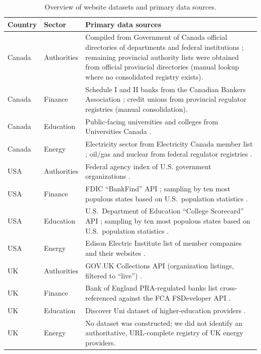 \documentclass[conference]{IEEEtran}
\begin{document}
\begin{table}[t]
  \caption{Overview of website datasets and primary data sources.}
  \label{tab:dataset_sources}
  \centering
  \scriptsize
  \setlength{\tabcolsep}{3pt}
  \renewcommand{\arraystretch}{1.15}
  \begin{tabularx}{\columnwidth}{l l X}
  \toprule
  Country & Sector & Primary data sources \\
  \midrule
  Canada & Authorities &
  Compiled from Government of Canada official directories of departments and federal institutions
  \cite{canada_depts,canada_institutions}; remaining provincial authority lists were obtained from
  official provincial directories (manual lookup where no consolidated registry exists). \\
  Canada & Finance &
  Schedule I and II banks from the Canadian Bankers Association \cite{cba_member_banks_2024};
  credit unions from provincial regulator registries (manual consolidation). \\
  Canada & Education &
  Public-facing universities and colleges from Universities Canada \cite{ca_unis_list}. \\
  Canada & Energy &
  Electricity sector from Electricity Canada member list \cite{electric_canada_members};
  oil/gas and nuclear from federal regulator registries \cite{cer_pipeline_companies,cnsc_nuclear_facilities}. \\
  \addlinespace[0.4em]
  USA & Authorities &
  Federal agency index of U.S. government organizations \cite{usa-agency-index}. \\
  USA & Finance &
  FDIC ``BankFind'' API \cite{fdic-bankfind-api}; sampling by ten most populous states based on
  U.S.\ population statistics \cite{us-population-stats}. \\
  USA & Education &
  U.S.\ Department of Education ``College Scorecard'' API \cite{us-college-scorecard-docs};
  sampling by ten most populous states based on U.S.\ population statistics \cite{us-population-stats}. \\
  USA & Energy &
  Edison Electric Institute list of member companies and their websites \cite{edison-electric-member-sites}. \\
  \addlinespace[0.4em]
  UK & Authorities &
  GOV.UK Collections API (organization listings, filtered to ``live'') \cite{uk-gov-collections-api-docs}. \\
  UK & Finance &
  Bank of England PRA-regulated banks list \cite{uk-pra-creditunions-list} cross-referenced against
  the FCA FSDeveloper API \cite{uk-fca-api-docs}. \\
  UK & Education &
  Discover Uni dataset of higher-education providers \cite{hesa_discoveruni_2024}. \\
  UK & Energy &
  No dataset was constructed; we did not identify an authoritative, URL-complete registry of UK energy providers. \\
  \bottomrule
  \end{tabularx}
\end{table}
\end{document}
